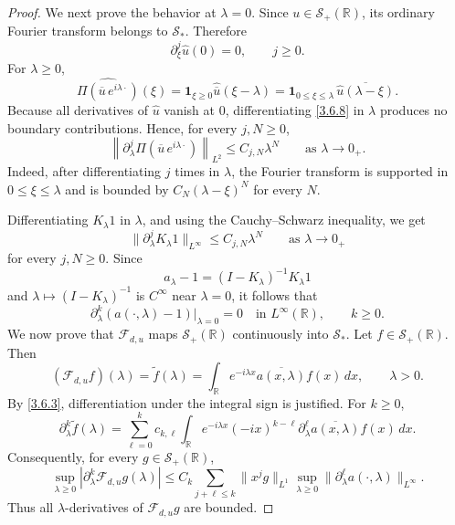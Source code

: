 \documentclass[10pt]{article}
\numberwithin{equation}{section}
\numberwithin{theorem}{section}
\begin{document}
\begin{proof}
We next prove the behavior at \(\lambda=0\). Since \(u\in\mathcal S_+(\mathbb R)\), its
ordinary Fourier transform belongs to \(\mathcal S_*\). Therefore
\begin{equation}
\label{3.6.7}
\partial_\xi^j\widehat u(0)=0,
\qquad j\ge0 .
\end{equation}
For \(\lambda\ge0\),
\begin{equation}
\label{3.6.8}
\widehat{\Pi(\overline u\,e^{i\lambda\cdot})}(\xi)
=
\mathbf 1_{\xi\ge0}\widehat{\overline u}(\xi-\lambda)
=
\mathbf 1_{0\le\xi\le\lambda}\,
\overline{\widehat u(\lambda-\xi)} .
\end{equation}
Because all derivatives of \(\widehat u\) vanish at \(0\), differentiating
\eqref{3.6.8} in \(\lambda\) produces no boundary contributions. Hence, for every
\(j,N\ge0\),
\begin{equation}
\label{3.6.9}
\left\|
\partial_\lambda^j
\Pi(\overline u\,e^{i\lambda\cdot})
\right\|_{L^2}
\le C_{j,N}\lambda^N
\qquad\text{as }\lambda\to0_{+}.
\end{equation}
Indeed, after differentiating \(j\) times in \(\lambda\), the Fourier transform is
supported in \(0\le\xi\le\lambda\) and is bounded by
\(C_N(\lambda-\xi)^N\) for every \(N\).

Differentiating \(K_\lambda1\) in \(\lambda\), and using the Cauchy--Schwarz inequality,
we get
\begin{equation}
\label{3.6.10}
\|\partial_\lambda^jK_\lambda1\|_{L^\infty}
\le C_{j,N}\lambda^N
\qquad\text{as }\lambda\to0_{+}
\end{equation}
for every \(j,N\ge0\). Since
\[
a_\lambda-1=(I-K_\lambda)^{-1}K_\lambda1
\]
and \(\lambda\mapsto (I-K_\lambda)^{-1}\) is \(C^\infty\) near \(\lambda=0\), it follows
that
\begin{equation}
\label{3.6.11}
\partial_\lambda^k(a(\cdot,\lambda)-1)\big|_{\lambda=0}=0
\quad\text{in }L^\infty(\mathbb R),
\qquad k\ge0.
\end{equation}
We now prove that \(\mathcal F_{d,u}\) maps \(\mathcal S_+(\mathbb R)\) continuously into
\(\mathcal S_*\). Let \(f\in\mathcal S_+(\mathbb R)\). Then
\begin{equation}
\label{3.6.12}
(\mathcal F_{d,u}f)(\lambda)
=
\widetilde f(\lambda)
=
\int_{\mathbb R}
e^{-i\lambda x}\overline{a(x,\lambda)}f(x)\,dx,
\qquad \lambda>0.
\end{equation}
By \eqref{3.6.3}, differentiation under the integral sign is justified. For \(k\ge0\),
\begin{equation}
\label{3.6.13}
\partial_\lambda^k\widetilde f(\lambda)
=
\sum_{\ell=0}^k
c_{k,\ell}
\int_{\mathbb R}
e^{-i\lambda x}
(-ix)^{k-\ell}
\partial_\lambda^\ell\overline{a(x,\lambda)}
f(x)\,dx .
\end{equation}
Consequently, for every \(g\in\mathcal S_+(\mathbb R)\),
\begin{equation}
\label{3.6.14}
\sup_{\lambda\ge0}
|\partial_\lambda^k\mathcal F_{d,u}g(\lambda)|
\le
C_k
\sum_{j+\ell\le k}
\|x^jg\|_{L^1}
\sup_{\lambda\ge0}
\|\partial_\lambda^\ell a(\cdot,\lambda)\|_{L^\infty}.
\end{equation}
Thus all \(\lambda\)-derivatives of \(\mathcal F_{d,u}g\) are bounded.


\end{proof}
\end{document}
